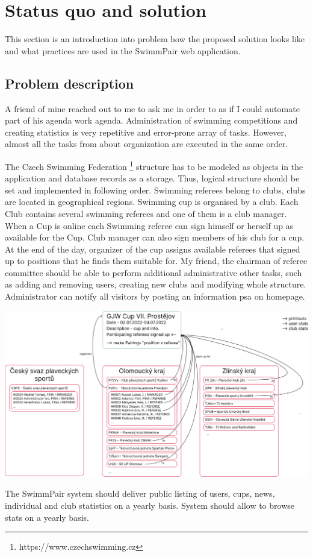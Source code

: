 \chapter{Status quo and solution}
This section is an introduction into problem how the proposed solution looks like and what practices are used in the SwimmPair web application. 
\section{Problem description}
\par
A friend of mine reached out to me to ask me in order to as if I could automate part of his agenda work agenda. Administration of swimming competitions and creating statistics is very repetitive and error-prone array of tasks. However, almost all the tasks from about organization are executed in the same order.
\par
The Czech Swimming Federation \footnote{https://www.czechswimming.cz} structure has to be modeled as objects in the application and database records as a storage. Thus, logical structure should be set and implemented in following order. Swimming referees belong to clubs, clubs are located in geographical regions. Swimming cup is organised by a club. Each Club contains several swimming referees and one of them is a club manager. When a Cup is online each Swimming referee can sign himself or herself up as available for the Cup. Club manager can also sign members of his club for a cup. At the end of the day, organizer of the cup assigns available referees that signed up to positions that he finds them suitable for. My friend, the chairman of referee committee should be able to perform additional administrative other tasks, such as adding and removing users, creating new clubs and modifying whole structure. Administrator can notify all visitors by posting an information psa on homepage.
\par
\includegraphics[scale=0.335]{img/swimmpair_schema.png}
\par
The SwimmPair system should deliver public listing of users, cups, news, individual and club statistics on a yearly basis. System should allow to browse stats on a yearly basis. 

